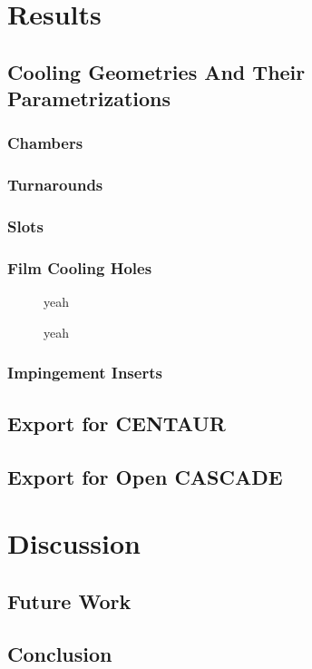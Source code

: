 \documentclass[a4paper, 11pt]{report}
\theoremstyle{definition}
\begin{document}
\chapter{Results}
\section{Cooling Geometries And Their Parametrizations}
\subsection{Chambers}
\subsection{Turnarounds}
\subsection{Slots}
\subsection{Film Cooling Holes}
\begin{figure}[!ht]
	\centering
	
	\caption{yeah}
\end{figure}
\begin{figure}[!ht]
	\centering
	
	\caption{yeah}
\end{figure}


\subsection{Impingement Inserts}
\section{Export for CENTAUR}
\section{Export for Open CASCADE}

\chapter{Discussion}
\section{Future Work}
\section{Conclusion}
\cite{Piegl1997}

\printbibliography[heading=bibnumbered, title=References]
\end{document}
